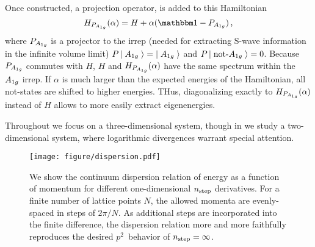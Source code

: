 Once constructed, a projection operator, is added to this Hamiltonian
\begin{equation}
    H_{P_{\Aoneg}}(\alpha) = H + \alpha (\one - P_{\Aoneg}) \, ,
\end{equation}
where $P_{A_{1g}}$ is a projector to the \Aoneg irrep (needed for extracting S-wave information in the infinite volume limit) $P \left|\;A_{1g}\;\right\rangle = \left|\;A_{1g}\;\right\rangle$ and  $P \left|\;\text{not-} A_{1g}\;\right\rangle = 0$.
Because $P_{A_{1g}}$ commutes with $H$, $H$ and $H_{P_{A_{1g}}}(\alpha)$ have the same spectrum within the $A_{1g}$ irrep.
If $\alpha$ is much larger than the expected energies of the Hamiltonian, all not-\Aoneg states are shifted to higher energies.
THus, diagonalizing exactly to $H_{P_{A_{1g}}}(\alpha)$ instead of $H$ allows to more easily extract \Aoneg eigenenergies.

Throughout we focus on a three-dimensional system, though in  we study a two-dimensional system, where logarithmic divergences warrant special attention.

\begin{figure}
    \texttt{[image: figure/dispersion.pdf]}
    \caption{We show the continuum dispersion relation of energy as a function of momentum for different one-dimensional ${n_\text{step}}$ derivatives.  For a finite number of lattice points $N$, the allowed momenta are evenly-spaced in steps of $2\pi/N$.
    As additional steps are incorporated into the finite difference, the dispersion relation more and more faithfully reproduces the desired $p^2$~behavior of ${n_\text{step}}=\infty$.
    }
    \label{fig:dispersion relation}
\end{figure}
